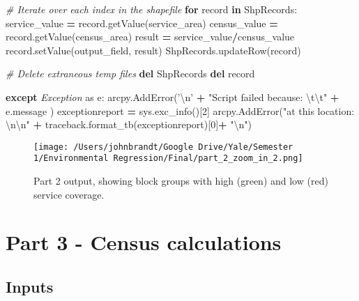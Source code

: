 \documentclass[11pt,]{article}
\newenvironment{Shaded}{\begin{snugshade}}{\end{snugshade}}
\newcommand{\KeywordTok}[1]{\textcolor[rgb]{0.13,0.29,0.53}{\textbf{{#1}}}}
\newcommand{\DecValTok}[1]{\textcolor[rgb]{0.00,0.00,0.81}{{#1}}}
\newcommand{\CharTok}[1]{\textcolor[rgb]{0.31,0.60,0.02}{{#1}}}
\newcommand{\StringTok}[1]{\textcolor[rgb]{0.31,0.60,0.02}{{#1}}}
\newcommand{\ImportTok}[1]{{#1}}
\newcommand{\CommentTok}[1]{\textcolor[rgb]{0.56,0.35,0.01}{\textit{{#1}}}}
\newcommand{\ControlFlowTok}[1]{\textcolor[rgb]{0.13,0.29,0.53}{\textbf{{#1}}}}
\newcommand{\OperatorTok}[1]{\textcolor[rgb]{0.81,0.36,0.00}{\textbf{{#1}}}}
\newcommand{\PreprocessorTok}[1]{\textcolor[rgb]{0.56,0.35,0.01}{\textit{{#1}}}}
\newcommand{\NormalTok}[1]{{#1}}
\begin{document}
\begin{Shaded}
\begin{Highlighting}[]
    \CommentTok{# Iterate over each index in the shapefile}
    \ControlFlowTok{for} \NormalTok{record }\OperatorTok{in} \NormalTok{ShpRecords:}
        \NormalTok{service_value }\OperatorTok{=} \NormalTok{record.getValue(service_area)}
        \NormalTok{census_value }\OperatorTok{=} \NormalTok{record.getValue(census_area)}
        \NormalTok{result }\OperatorTok{=} \NormalTok{service_value}\OperatorTok{/}\NormalTok{census_value}
        \NormalTok{record.setValue(output_field, result)}
        \NormalTok{ShpRecords.updateRow(record)}

    \CommentTok{# Delete extraneous temp files}
    \KeywordTok{del} \NormalTok{ShpRecords}
    \KeywordTok{del} \NormalTok{record}
    
\ControlFlowTok{except} \PreprocessorTok{Exception} \ImportTok{as} \NormalTok{e:}
    \NormalTok{arcpy.AddError(}\StringTok{'}\CharTok{\textbackslash{}n}\StringTok{'} \OperatorTok{+} \StringTok{"Script failed because: }\CharTok{\textbackslash{}t\textbackslash{}t}\StringTok{"} \OperatorTok{+} \NormalTok{e.message )}
    \NormalTok{exceptionreport }\OperatorTok{=} \NormalTok{sys.exc_info()[}\DecValTok{2}\NormalTok{]}
    \NormalTok{arcpy.AddError(}\StringTok{"at this location: }\CharTok{\textbackslash{}n\textbackslash{}n}\StringTok{"} \OperatorTok{+} 
    \NormalTok{traceback.format_tb(exceptionreport)[}\DecValTok{0}\NormalTok{]}\OperatorTok{+} \StringTok{"}\CharTok{\textbackslash{}n}\StringTok{"}\NormalTok{)}
\end{Highlighting}
\end{Shaded}

\begin{figure}[htbp]
\centering
\texttt{[image: /Users/johnbrandt/Google Drive/Yale/Semester 1/Environmental Regression/Final/part\_2\_zoom\_in\_2.png]}
\caption{Part 2 output, showing block groups with high (green) and low
(red) service coverage.}
\end{figure}

\pagebreak

\section{Part 3 - Census
calculations}\label{part-3---census-calculations}

\subsection{Inputs}\label{inputs-2}
\end{document}
